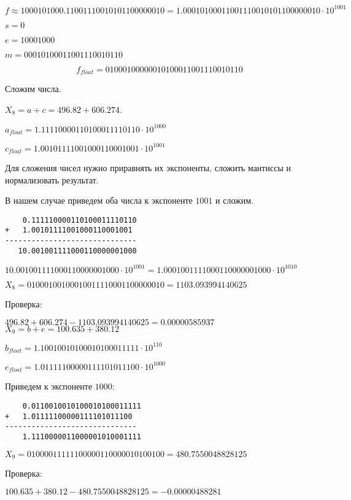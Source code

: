 \documentclass[a4paper,12pt]{article}
\begin{document}
$f \approx 1000101000.11001110010101100000010 = 1.00010100011001110010101100000010 \cdot 10^{1001}$

$s = 0$

$e = 10001000$

$m = 00010100011001110010110$

\[f_{float} = 01000100000010100011001110010110\]

\newpage

Сложим числа.

$X_8 = a + c = 496.82 + 606.274$.

$a_{float} = 1.11110000110100011110110 \cdot 10^{1000}$

$c_{float} = 1.00101111001000110001001 \cdot 10^{1001}$

Для сложения чисел нужно приравнять их экспоненты, сложить мантиссы и нормализовать результат.

В нашем случае приведем оба числа к экспоненте $1001$ и сложим.

\begin{verbatim}
    0.111110000110100011110110
+   1.00101111001000110001001
------------------------------
   10.001001111000110000001000
\end{verbatim}

$10.001001111000110000001000 \cdot 10^{1001} = 1.0001001111000110000001000 \cdot 10^{1010}$

$X_8 = 0 10001001 00010011110001100000010 = 1103.093994140625$

Проверка:

$496.82 + 606.274 - 1103.093994140625 = 0.00000585937$
\\

$X_9 = b + e = 100.635 + 380.12$

$b_{float} = 1.10010010100010100011111 \cdot 10^{110}$

$e_{float} = 1.01111100000111101011100 \cdot 10^{1000}$

Приведем к экспоненте $1000$:

\begin{verbatim}
    0.0110010010100010100011111
+   1.01111100000111101011100
------------------------------
    1.1110000011000001010001111
\end{verbatim}

$X_9 = 0 10000111 11100000110000010100100 = 480.7550048828125$

Проверка:

$100.635 + 380.12 - 480.7550048828125 = -0.00000488281$
\\
\end{document}
